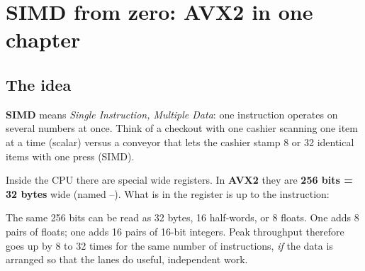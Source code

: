 \chapter{SIMD from zero: AVX2 in one chapter}\label{ch:simd}

\section{The idea}

\textbf{SIMD} means \emph{Single Instruction, Multiple Data}: one instruction operates on several numbers at once. Think of a checkout with one cashier scanning one item at a time (scalar) versus a conveyor that lets the cashier stamp 8 or 32 identical items with one press (SIMD).

Inside the CPU there are special wide registers. In \textbf{AVX2} they are \textbf{256 bits = 32 bytes} wide (named --). What is in the register is up to the instruction:

\begin{center}
\end{center}
The same 256 bits can be read as 32 bytes, 16 half-words, or 8 floats. One  adds 8 pairs of floats; one  adds 16 pairs of 16-bit integers. Peak throughput therefore goes up by 8 to 32 times for the same number of instructions, \emph{if} the data is arranged so that the lanes do useful, independent work.

